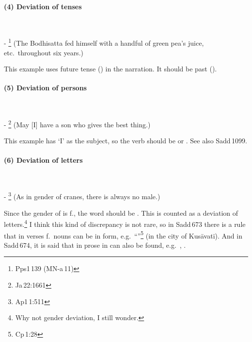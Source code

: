 \paragraph*{(4) Deviation of tenses}\ \par
- \footnote{Pps1\,139 (MN-a\,11)} (The Bodhisatta fed himself with a handful of green pea's juice, etc.\ throughout six years.)\par
This example uses future tense () in the narration. It should be past ().

\paragraph*{(5) Deviation of persons}\ \par
- \footnote{Ja\,22:1661} (May [I] have a son who gives the best thing.)\par
This example has `I' as the subject, so the verb should be  or . See also Sadd\,1099.

\paragraph*{(6) Deviation of letters}\ \par
- \footnote{Ap1\,1:511} (As in gender of cranes, there is always no male.)\par
Since the gender of  is f., the word should be . This is counted as a deviation of letters.\footnote{Why not gender deviation, I still wonder.} I think this kind of discrepancy is not rare, so in Sadd\,673 there is a rule that in verses f.\ nouns can be in  form, e.g.\ ``''\footnote{Cp\,1:28} (in the city of Kus\=avat\=i). And in Sadd\,674, it is said that in prose in can also be found, e.g.\ , .



